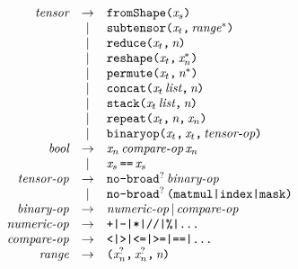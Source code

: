 \documentclass{article}
\begin{document}
\begin{Large}
  \[\begin{array}{lcrclr}

  && \w{tensor} & \rar & \texttt{fromShape(} \w{x}_{s} \texttt{)} & \\
  && & | & \texttt{subtensor(} \w{x}_{t} \texttt{,} \, \w{range}^{*} \texttt{)} & \\
  && & | & \texttt{reduce(} \w{x}_{t} \texttt{,} \, \w{n} \texttt{)} & \\
  && & | & \texttt{reshape(} \w{x}_{t} \texttt{,} \, \w{x}_{n}^{*} \texttt{)} & \\
  && & | & \texttt{permute(} \w{x}_{t} \texttt{,} \, \w{n}^{*} \texttt{)} & \\
  && & | & \texttt{concat(} \w{x}_{t}\,\w{list} \texttt{,} \, \w{n} \texttt{)} & \\
  && & | & \texttt{stack(} \w{x}_{t}\,\w{list} \texttt{,} \, \w{n} \texttt{)} & \\
  && & | & \texttt{repeat(} \w{x}_{t} \texttt{,} \, \w{n} \texttt{,} \, \w{x}_{n} \texttt{)} & \\
  && & | & \texttt{binaryop(} \w{x}_{t} \texttt{,} \, \w{x}_{t} \texttt{,} \, \w{tensor-op} \texttt{)} & \\

  && \w{bool} & \rar & \w{x}_{n} \, \w{compare-op} \, \w{x}_{n} & \\
  &&  & | & \w{x}_{s} \, \ttt{==} \, \w{x}_{s} & \\

  && \w{tensor-op} & \rar & \texttt{no-broad}^{?} \, \w{binary-op} & \\
  &&           & | & \texttt{no-broad}^{?} \, \texttt{(matmul|index|mask)} & \\

  && \w{binary-op} & \rar & \w{numeric-op} \, | \, \w{compare-op} & \\
  && \w{numeric-op} & \rar & \texttt{+|-|*|//|\%|...} & \\
  && \w{compare-op} & \rar & \texttt{<|>|<=|>=|==|...} & \\

  && \w{range} & \rar & \texttt{(} \w{x}_{n}^{?} \texttt{,} \, \w{x}_{n}^{?} \texttt{,} \, \w{n} \texttt{)} & \\



\end{array}\] \\
\end{Large}
\end{document}
